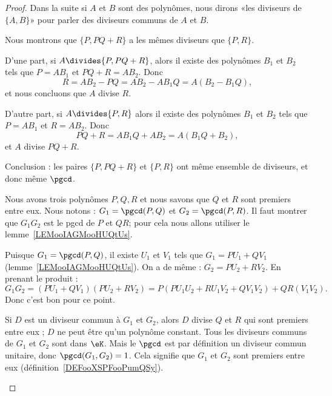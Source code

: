 \begin{proof}
	Dans la suite si \( A\) et \( B\) sont des polynômes, nous dirons «les diviseurs de \( \{ A,B \}\)» pour parler des diviseurs communs de \( A\) et \( B\).

	\begin{enumerate}
		\spitem[\ref{ITEMooBPOZooYeFGjl}]

		Nous montrons que \( \{ P,PQ+R \}\) a les mêmes diviseurs que \( \{ P,R \}\).

		D'une part, si \( A\divides\{ P,PQ+R \}\), alors il existe des polynômes \( B_1\) et \( B_2\) tels que \( P=AB_1\) et \( PQ+R=AB_2\). Donc
		\begin{equation}
			R=AB_2-PQ=AB_2-AB_1Q=A(B_2-B_1Q),
		\end{equation}
		et nous concluons que \( A\) divise \( R\).

		D'autre part, si \( A\divides\{ P,R \}\) alors il existe des polynômes \( B_1\) et \( B_2\) tels que \( P=AB_1\) et \( R=AB_2\). Donc
		\begin{equation}
			PQ+R=AB_1Q+AB_2=A(B_1Q+B_2),
		\end{equation}
		et \( A\) divise \( PQ+R\).

		Conclusion : les paires \( \{ P,PQ+R \}\) et \( \{ P,R \}\) ont même ensemble de diviseurs, et donc même \( \pgcd\).

		\spitem[\ref{ITEMooUVGRooNSGDZn}]

		Nous avons trois polynômes \( P,Q,R\) et nous savons que \( Q\) et \( R\) sont premiers entre eux. Nous notons : \( G_1=\pgcd(P,Q)\) et \( G_2=\pgcd(P,R)\).  Il faut montrer que \( G_1G_2\) est le pgcd de \( P\) et \( QR\); pour cela nous allons utiliser le lemme~\ref{LEMooIAGMooHUQtUs}.

		\begin{subproof}
			\spitem[\( \exists U,V\) tels que \( G_1G_2=PU+QRV\) ]

			Puisque \( G_1=\pgcd(P,Q)\), il existe \( U_1\) et \( V_1\) tels que \( G_1=PU_1+QV_1\) (lemme~\ref{LEMooIAGMooHUQtUs}).
			On a de même : \( G_2=PU_2+RV_2\). En prenant le produit :
			\begin{equation}
				G_1G_2=(PU_1+QV_1)(PU_2+RV_2)=P(PU_1U_2+RU_1V_2+QV_1V_2)+QR(V_1V_2).
			\end{equation}
			Donc c'est bon pour ce point.


			Si \( D\) est un diviseur commun à \( G_1\) et \( G_2\), alors \( D\) divise \( Q\) et \( R\) qui sont premiers entre eux ; \( D\) ne peut être qu'un polynôme constant. Tous les diviseurs communs de \( G_1\) et \( G_2\) sont dans \( \eK\). Mais le \( \pgcd\) est par définition un diviseur commun unitaire, donc \( \pgcd(G_1,G_2)=1\). Cela signifie que \( G_1\) et \( G_2\) sont premiers entre eux (définition~\ref{DEFooXSPFooPumQSy}).


\end{subproof}
\end{enumerate}
\end{proof}
